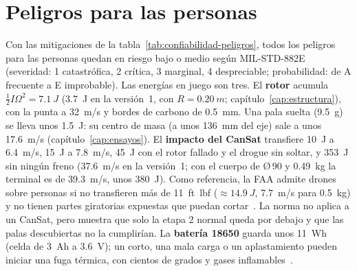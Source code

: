 \section{Peligros para las personas}\label{sec:confiabilidad-peligros}
Con las mitigaciones de la tabla~\ref{tab:confiabilidad-peligros}, todos los peligros
para las personas quedan en riesgo bajo o medio según
MIL-STD-882E~\cite{confiabilidad-milstd882e} (severidad: 1 catastrófica, 2 crítica,
3 marginal, 4 despreciable; probabilidad: de A frecuente a E improbable). Las energías en
juego son tres. El \textbf{rotor} acumula $\tfrac12 I\Omega^2=\SI{7.1}{J}$
(\SI{3.7}{J} en la versión~1, con $R=\SI{0.20}{m}$; capítulo~\ref{cap:estructura}), con la punta
a \SI{32}{m/s} y bordes de carbono de \SI{0.5}{mm}. Una pala suelta (\SI{9.5}{g}) se lleva
unos \SI{1.5}{J}: su centro de masa (a unos \SI{136}{mm} del eje) sale a unos
\SI{17.6}{m/s} (capítulo~\ref{cap:ensayos}).
El \textbf{impacto del CanSat} transfiere \SI{10}{J} a \SI{6.4}{m/s}, \SI{15}{J} a
\SI{7.8}{m/s}, \SI{45}{J} con el rotor fallado y el drogue sin soltar, y \SI{353}{J} sin ningún freno
(\SI{37.6}{m/s} en la versión~1; con el cuerpo de Ø\,90 y \SI{0.49}{kg} la terminal es de
\SI{39.3}{m/s}, unos \SI{380}{J}). Como referencia, la FAA admite drones sobre personas si no transfieren
más de \SI{11}{ft.lbf} ($\approx\SI{14.9}{J}$, \SI{7.7}{m/s} para \SI{0.5}{kg}) y no
tienen partes giratorias expuestas que puedan cortar~\cite{confiabilidad-faa2021}. La
norma no aplica a un CanSat, pero muestra que solo la etapa 2 normal queda por debajo y
que las palas descubiertas no la cumplirían. La \textbf{batería 18650} guarda unos
\SI{11}{Wh} (celda de \SI{3}{Ah} a \SI{3.6}{V}); un corto, una mala carga o un aplastamiento pueden iniciar una fuga térmica,
con cientos de grados y gases inflamables~\cite{confiabilidad-feng2018}.

